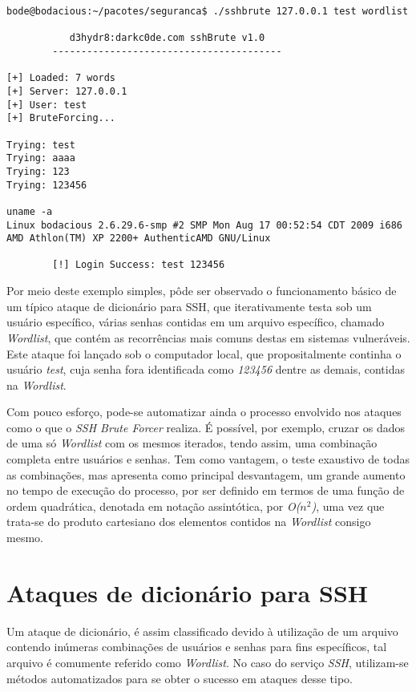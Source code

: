 \begin{verbatim}
bode@bodacious:~/pacotes/seguranca$ ./sshbrute 127.0.0.1 test wordlist

           d3hydr8:darkc0de.com sshBrute v1.0
        ----------------------------------------

[+] Loaded: 7 words
[+] Server: 127.0.0.1
[+] User: test
[+] BruteForcing...

Trying: test
Trying: aaaa
Trying: 123
Trying: 123456

uname -a
Linux bodacious 2.6.29.6-smp #2 SMP Mon Aug 17 00:52:54 CDT 2009 i686
AMD Athlon(TM) XP 2200+ AuthenticAMD GNU/Linux

        [!] Login Success: test 123456
\end{verbatim}

Por meio deste exemplo simples, pôde ser observado o funcionamento básico de um típico ataque de dicionário para SSH, que iterativamente testa sob um usuário específico, várias senhas contidas em um arquivo específico, chamado \textit{Wordlist}, que contém as recorrências mais comuns destas em sistemas vulneráveis. Este ataque foi lançado sob o computador local, que propositalmente continha o usuário \textit{test}, cuja senha fora identificada como \textit{123456} dentre as demais, contidas na \textit{Wordlist}.

Com pouco esforço, pode-se automatizar ainda o processo envolvido nos ataques como o que o \textit{SSH Brute Forcer} realiza. É possível, por exemplo, cruzar os dados de uma só \textit{Wordlist} com os mesmos iterados, tendo assim, uma combinação completa entre usuários e senhas. Tem como vantagem, o teste exaustivo de todas as combinações, mas apresenta como principal desvantagem, um grande aumento no tempo de execução do processo, por ser definido em termos de uma função de ordem quadrática, denotada em notação assintótica, por \textit{O(\begin{math}n^2\end{math})}, uma vez que trata-se do produto cartesiano dos elementos contidos na \textit{Wordlist} consigo mesmo.

\section{Ataques de dicionário para SSH}

Um ataque de dicionário, é assim classificado devido à utilização de um arquivo contendo inúmeras combinações de usuários e senhas para fins específicos, tal arquivo é comumente referido como \textit{Wordlist}. No caso do serviço \textit{SSH}, utilizam-se métodos automatizados para se obter o sucesso em ataques desse tipo.

